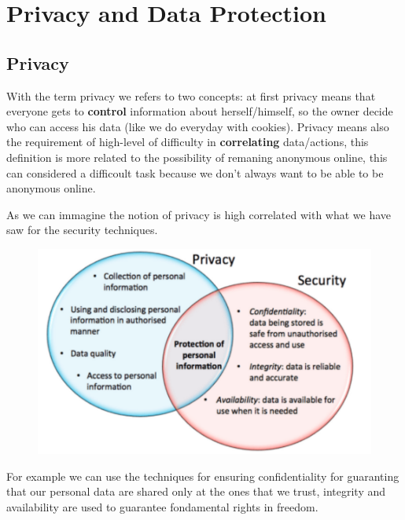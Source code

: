 \section{Privacy and Data Protection}
\subsection{Privacy}
With the term privacy we refers to two concepts: at first privacy means that everyone gets to \textbf{control} information about herself/himself, so the owner decide who can access his data (like we do everyday with cookies). Privacy means also the requirement of high-level of difficulty in \textbf{correlating} data/actions, this definition is more related to the possibility of remaning anonymous online, this can considered a difficoult task because we don't always want to be able to be anonymous online. 

As we can immagine the notion of privacy is high correlated with what we have saw for the security techniques.
\begin{figure}[h!]
    \centering
    \includegraphics[scale=0.35]{images/privacy1.png}
\end{figure}

\FloatBarrier

For example we can use the techniques for ensuring confidentiality for guaranting that our personal data are shared only at the ones that we trust, integrity and availability are used to guarantee fondamental rights in freedom.

